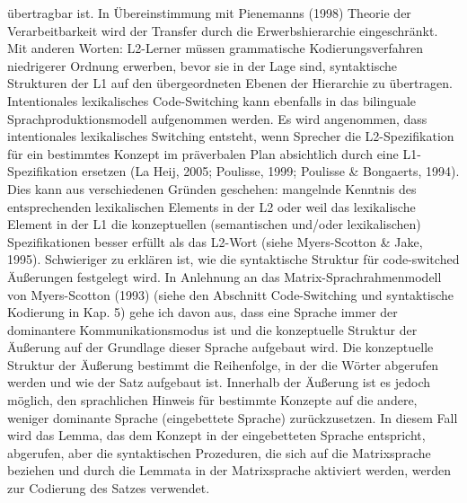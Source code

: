 \documentclass[
  letterpaper,
]{scrbook}
\begin{document}
übertragbar ist. In Übereinstimmung mit Pienemanns (1998) Theorie der
Verarbeitbarkeit wird der Transfer durch die Erwerbshierarchie
eingeschränkt. Mit anderen Worten: L2-Lerner müssen grammatische
Kodierungsverfahren niedrigerer Ordnung erwerben, bevor sie in der Lage
sind, syntaktische Strukturen der L1 auf den übergeordneten Ebenen der
Hierarchie zu übertragen. Intentionales lexikalisches Code-Switching
kann ebenfalls in das bilinguale Sprachproduktionsmodell aufgenommen
werden. Es wird angenommen, dass intentionales lexikalisches Switching
entsteht, wenn Sprecher die L2-Spezifikation für ein bestimmtes Konzept
im präverbalen Plan absichtlich durch eine L1-Spezifikation ersetzen (La
Heij, 2005; Poulisse, 1999; Poulisse \& Bongaerts, 1994). Dies kann aus
verschiedenen Gründen geschehen: mangelnde Kenntnis des entsprechenden
lexikalischen Elements in der L2 oder weil das lexikalische Element in
der L1 die konzeptuellen (semantischen und/oder lexikalischen)
Spezifikationen besser erfüllt als das L2-Wort (siehe Myers-Scotton \&
Jake, 1995). Schwieriger zu erklären ist, wie die syntaktische Struktur
für code-switched Äußerungen festgelegt wird. In Anlehnung an das
Matrix-Sprachrahmenmodell von Myers-Scotton (1993) (siehe den Abschnitt
Code-Switching und syntaktische Kodierung in Kap. 5) gehe ich davon aus,
dass eine Sprache immer der dominantere Kommunikationsmodus ist und die
konzeptuelle Struktur der Äußerung auf der Grundlage dieser Sprache
aufgebaut wird. Die konzeptuelle Struktur der Äußerung bestimmt die
Reihenfolge, in der die Wörter abgerufen werden und wie der Satz
aufgebaut ist. Innerhalb der Äußerung ist es jedoch möglich, den
sprachlichen Hinweis für bestimmte Konzepte auf die andere, weniger
dominante Sprache (eingebettete Sprache) zurückzusetzen. In diesem Fall
wird das Lemma, das dem Konzept in der eingebetteten Sprache entspricht,
abgerufen, aber die syntaktischen Prozeduren, die sich auf die
Matrixsprache beziehen und durch die Lemmata in der Matrixsprache
aktiviert werden, werden zur Codierung des Satzes verwendet.
\end{document}
